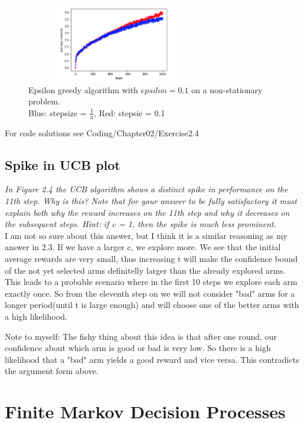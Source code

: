 \documentclass[12pt,a4paper]{article}
\begin{document}
\begin{figure}
	\includegraphics[width=0.7\textwidth, height = 130px]{images/stepsize_comparison_non_stationary.png}
	\caption{Epsilon greedy algorithm with $epsilon = 0.1$ on a non-stationary problem. \\ Blue: stepsize = $\frac{1}{n}$, Red: stepsie = 0.1}
\end{figure}

For code solutions see Coding/Chapter02/Exercise2.4

\subsection{Spike in UCB plot}
\textit{In Figure 2.4 the UCB algorithm shows a distinct spike in performance on the 11th step. Why is this? Note that for your answer to be fully satisfactory it must explain both why the reward increases on the 11th step and why it decreases on the subsequent steps. Hint: if c = 1, then the spike is much less prominent.} \\ 

I am not so sure about this answer, but I think it is a similar reasoning as my answer in 2.3. If we have a larger c, we explore more. We see that the initial average rewards are very small, thus increasing t will make the confidence bound of the not yet selected arms definitelly larger than the already explored arms. This leads to a probable scenario where in the first 10 steps we explore each arm exactly once. So from the eleventh step on we will not consider "bad" arms for a longer period(until t is large enough) and will choose one of the better arms with a high likelihood. 

Note to myself: The fishy thing about this idea is that after one round, our confidence about which arm is good or bad is very low. So there is a high likelihood that a "bad" arm yields a good reward and vice versa. This contradicts the argument form above. 

\section{Finite Markov Decision Processes}
\end{document}
